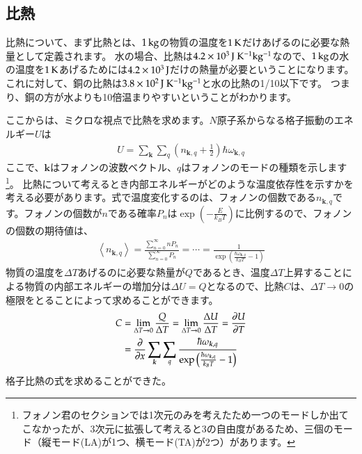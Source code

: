 \documentclass[10pt,b5paper,papersize,dvipdfmx]{jsbook}
\begin{document}
\subsection{比熱}
比熱について、まず比熱とは、$1 \tani{kg}$の物質の温度を$1 \tani{K}$だけあげるのに必要な熱量として定義されます。
水の場合、比熱は$4.2 \times 10^3 \tani{J\ K ^{-1} kg^{-1}}$なので、$1 \tani{kg}$の水の温度を$1 \tani{K}$あげるためには$4.2 \times 10^3 \tani{J}$だけの熱量が必要ということになります。
これに対して、銅の比熱は$3.8 \times 10^2\tani{J\ K ^{-1} kg^{-1}}$と水の比熱の1/10以下です。
つまり、銅の方が水よりも10倍温まりやすいということがわかります。\par
ここからは、ミクロな視点で比熱を求めます。$N$原子系からなる格子振動のエネルギー$U$は
\begin{align}
  U = \sum_{\bm{k}}\sum_{q}\left(n_{\bm{k},q} + \frac{1}{2}\right)\hbar \omega_{\bm{k},q}
  \label{eq:nemui}
\end{align}
ここで、$\bm{k}$はフォノンの波数ベクトル、$q$はフォノンのモードの種類を示します
\footnote{
  フォノン君のセクションでは1次元のみを考えたため一つのモードしか出てこなかったが、3次元に拡張して考えると3の自由度があるため、三個のモード（縦モード(LA)が1つ、横モード(TA)が2つ）があります。
}。
比熱について考えるとき内部エネルギーがどのような温度依存性を示すかを考える必要があります。式で温度変化するのは、フォノンの個数である$n_{\bm{k},q}$です。フォノンの個数が$n$である確率$P_n$は$\exp\left(-\frac{E}{k_BT}\right)$に比例するので、フォノンの個数の期待値は、
\begin{align}
  \left\langle n_{\bm{k},q}\right\rangle = \frac{\sum_{n = 0}^\infty nP_n}{\sum_{n = 0}^\infty P_n} = \cdots = \frac{1}{\exp \left(\frac{\hbar \omega_{\bm{k}, q}}{k_BT}-1\right)}
\end{align}
物質の温度を$\Delta T$あげるのに必要な熱量が$Q$であるとき、温度$\Delta T$上昇することによる物質の内部エネルギーの増加分は$\Delta U = Q$となるので、比熱$C$は、$\Delta T \rightarrow 0$の極限をとることによって求めることができます。
\begin{align}
  C &= \lim_{\Delta T \rightarrow 0} \frac{Q}{\Delta T} = \lim_{\Delta T \rightarrow 0} \frac{\Delta U}{\Delta T} = \pdv{U}{T} \notag\\
    &= \pdv{x} \sum_{\bm{k}}\sum_{q}\frac{\hbar \omega_{\bm{k},q}}{\exp\left(\frac{\hbar \omega_{\bm{k},q}}{k_BT}-1\right)}
\label{eq:totemonemutai}
\end{align}
格子比熱の式を求めることができた。
\end{document}
